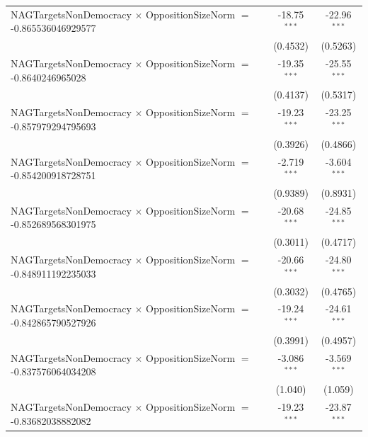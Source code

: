 \begin{tabular}{lcc}
   NAGTargetsNonDemocracy $\times$ OppositionSizeNorm $=$ -0.865536046929577    & -18.75$^{***}$       & -22.96$^{***}$\\   
                                                                                & (0.4532)             & (0.5263)\\   
   NAGTargetsNonDemocracy $\times$ OppositionSizeNorm $=$ -0.8640246965028      & -19.35$^{***}$       & -25.55$^{***}$\\   
                                                                                & (0.4137)             & (0.5317)\\   
   NAGTargetsNonDemocracy $\times$ OppositionSizeNorm $=$ -0.857979294795693    & -19.23$^{***}$       & -23.25$^{***}$\\   
                                                                                & (0.3926)             & (0.4866)\\   
   NAGTargetsNonDemocracy $\times$ OppositionSizeNorm $=$ -0.854200918728751    & -2.719$^{***}$       & -3.604$^{***}$\\   
                                                                                & (0.9389)             & (0.8931)\\   
   NAGTargetsNonDemocracy $\times$ OppositionSizeNorm $=$ -0.852689568301975    & -20.68$^{***}$       & -24.85$^{***}$\\   
                                                                                & (0.3011)             & (0.4717)\\   
   NAGTargetsNonDemocracy $\times$ OppositionSizeNorm $=$ -0.848911192235033    & -20.66$^{***}$       & -24.80$^{***}$\\   
                                                                                & (0.3032)             & (0.4765)\\   
   NAGTargetsNonDemocracy $\times$ OppositionSizeNorm $=$ -0.842865790527926    & -19.24$^{***}$       & -24.61$^{***}$\\   
                                                                                & (0.3991)             & (0.4957)\\   
   NAGTargetsNonDemocracy $\times$ OppositionSizeNorm $=$ -0.837576064034208    & -3.086$^{***}$       & -3.569$^{***}$\\   
                                                                                & (1.040)              & (1.059)\\   
   NAGTargetsNonDemocracy $\times$ OppositionSizeNorm $=$ -0.83682038882082     & -19.23$^{***}$       & -23.87$^{***}$\\   

\end{tabular}
